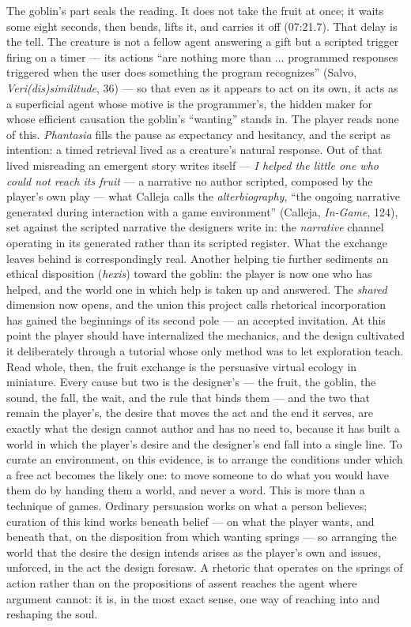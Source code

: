 \documentclass{article}
\begin{document}
The goblin's part seals the reading. It does not take the fruit at once; it waits some eight seconds, then bends, lifts it, and carries it off (07:21.7). That delay is the tell. The creature is not a fellow agent answering a gift but a scripted trigger firing on a timer — its actions ``are nothing more than ... programmed responses triggered when the user does something the program recognizes'' (Salvo, \textit{Veri(dis)similitude}, 36) — so that even as it appears to act on its own, it acts as a superficial agent whose motive is the programmer's, the hidden maker for whose efficient causation the goblin's ``wanting'' stands in. The player reads none of this. \textit{Phantasia} fills the pause as expectancy and hesitancy, and the script as intention: a timed retrieval lived as a creature's natural response. Out of that lived misreading an emergent story writes itself — \textit{I helped the little one who could not reach its fruit} — a narrative no author scripted, composed by the player's own play — what Calleja calls the \textit{alterbiography}, ``the ongoing narrative generated during interaction with a game environment'' (Calleja, \textit{In-Game}, 124), set against the scripted narrative the designers write in: the \textit{narrative} channel operating in its generated rather than its scripted register. What the exchange leaves behind is correspondingly real. Another helping tie further sediments an ethical disposition (\textit{hexis}) toward the goblin: the player is now one who has helped, and the world one in which help is taken up and answered. The \textit{shared} dimension now opens, and the union this project calls rhetorical incorporation has gained the beginnings of its second pole — an accepted invitation. At this point the player should have internalized the mechanics, and the design cultivated it deliberately through a tutorial whose only method was to let exploration teach. Read whole, then, the fruit exchange is the persuasive virtual ecology in miniature. Every cause but two is the designer's — the fruit, the goblin, the sound, the fall, the wait, and the rule that binds them — and the two that remain the player's, the desire that moves the act and the end it serves, are exactly what the design cannot author and has no need to, because it has built a world in which the player's desire and the designer's end fall into a single line. To curate an environment, on this evidence, is to arrange the conditions under which a free act becomes the likely one: to move someone to do what you would have them do by handing them a world, and never a word. This is more than a technique of games. Ordinary persuasion works on what a person believes; curation of this kind works beneath belief — on what the player wants, and beneath that, on the disposition from which wanting springs — so arranging the world that the desire the design intends arises as the player's own and issues, unforced, in the act the design foresaw. A rhetoric that operates on the springs of action rather than on the propositions of assent reaches the agent where argument cannot: it is, in the most exact sense, one way of reaching into and reshaping the soul.
\end{document}
